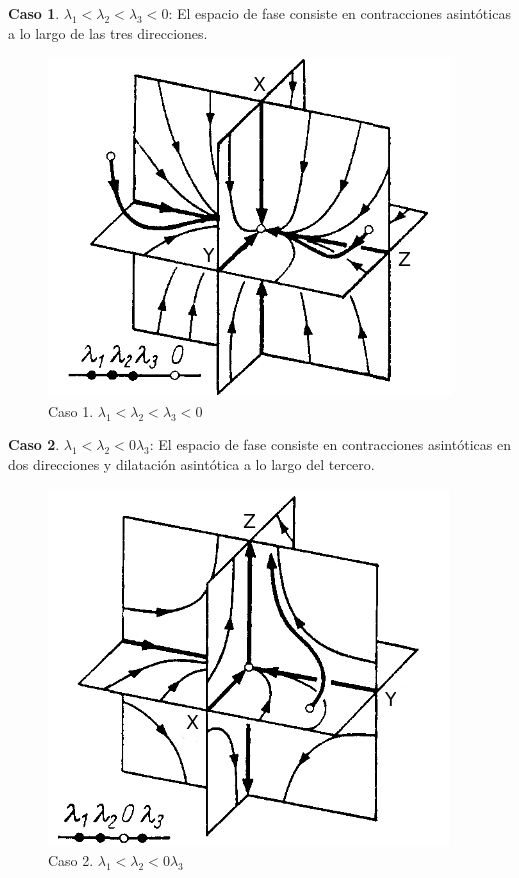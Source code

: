 \documentclass[a4paper,10pt]{article}
\begin{document}
\textbf{Caso 1}. $\lambda_1 < \lambda_2 < \lambda_3 < 0$: El espacio de fase consiste en contracciones asintóticas
a lo largo de las tres direcciones.

\begin{figure}[H]
 \centering
\includegraphics[scale=0.35]{problema3fig2}
\caption{Caso 1. $\lambda_1 < \lambda_2 < \lambda_3 < 0$}
\label{fig:problema3fig2}
\end{figure}
\vspace{.3cm}

\newpage

\textbf{Caso 2}. $\lambda_1 < \lambda_2 < 0 \lambda_3$: El espacio de fase consiste en contracciones asintóticas
en dos direcciones y dilatación asintótica a lo largo del tercero.

\begin{figure}[H]
 \centering
\includegraphics[scale=0.35]{problema3fig3}
\caption{Caso 2. $\lambda_1 < \lambda_2 < 0 \lambda_3$}
\label{fig:problema3fig3}
\end{figure}
\vspace{.3cm}
\end{document}

